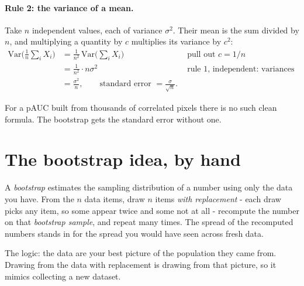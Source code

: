\paragraph{Rule 2: the variance of a mean.} Take $n$ independent values, each of variance $\sigma^2$. Their mean is the
sum divided by $n$, and multiplying a quantity by $c$ multiplies its variance by $c^2$:
\begin{align*}
\mathrm{Var}\Big(\tfrac1n \textstyle\sum_i X_i\Big) &= \tfrac{1}{n^2}\,\mathrm{Var}\Big(\textstyle\sum_i X_i\Big)
  && \text{pull out } c = 1/n\\
&= \tfrac{1}{n^2} \cdot n\sigma^2 && \text{rule 1, independent: variances add}\\
&= \frac{\sigma^2}{n}, \qquad \text{standard error } = \frac{\sigma}{\sqrt n}.
\end{align*}

For a pAUC built from thousands of correlated pixels there is no such clean formula. The bootstrap gets the standard
error without one.

\section{The bootstrap idea, by hand}\label{sec:bootstrap:idea}

\begin{definition}[Bootstrap]
A \emph{bootstrap} \citep{efron1979bootstrap} estimates the sampling distribution of a number using
only the data you have. From the $n$ data items, draw $n$ items \emph{with replacement} - each draw picks any item, so
some appear twice and some not at all - recompute the number on that \emph{bootstrap sample}, and repeat many times. The
spread of the recomputed numbers stands in for the spread you would have seen across fresh data.
\end{definition}

The logic: the data are your best picture of the population they came from. Drawing from the data with replacement is
drawing from that picture, so it mimics collecting a new dataset.


